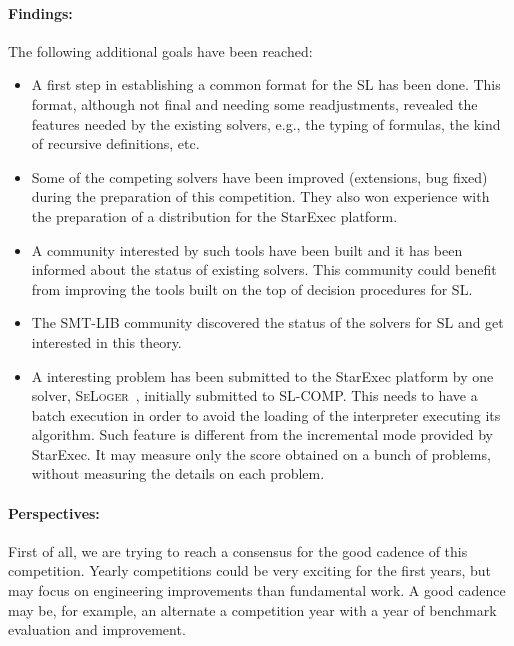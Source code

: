 \documentclass{llncs}
\begin{document}
\paragraph{Findings:}
The following additional goals have been reached:
\begin{itemize}
\item A first step in establishing a common format for the SL has been done. 
This format, although not final and needing some readjustments, revealed the features needed by the existing solvers, e.g., the typing of formulas, the kind of recursive definitions, etc.

\item Some of the competing solvers have been improved (extensions, bug fixed) during the preparation of this competition. They also won experience with the preparation of a distribution for the StarExec platform.

\item A community interested by such tools have been built and it has been informed about the status of existing solvers. This community could benefit from improving the tools built on the top of decision procedures for SL.

\item The SMT-LIB community discovered the status of the solvers for SL and get interested in this theory.

\item A interesting problem has been submitted to the StarExec platform by one solver, \textsc{SeLoger}~\cite{HasseIOP13}, initially submitted to SL-COMP. This needs to have a batch execution in order to avoid the loading of the interpreter executing its algorithm.
Such feature is different from the incremental mode provided by StarExec. It may measure only the score obtained on a bunch of problems, without measuring the details on each problem. 
 
\end{itemize}


\paragraph{Perspectives:}
First of all, we are trying to reach a consensus for the good cadence of this competition. Yearly competitions could be very exciting for the first years, but may focus on engineering improvements than fundamental work. 
A good cadence may be, for example, an alternate a competition year with a year of benchmark evaluation and improvement.
\end{document}
